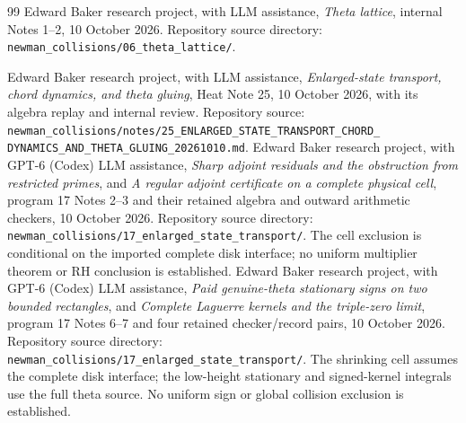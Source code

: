 \documentclass[11pt]{article}
\theoremstyle{definition}
\theoremstyle{remark}
\begin{document}
\begin{thebibliography}{99}
Edward Baker research project, with LLM assistance,
\emph{Theta lattice}, internal Notes 1--2, 10 October 2026.
Repository source directory:
\texttt{newman\_collisions/06\_theta\_lattice/}.

Edward Baker research project, with LLM assistance,
\emph{Enlarged-state transport, chord dynamics, and theta gluing},
Heat Note 25, 10 October 2026, with its algebra replay and internal review.
Repository source:
\texttt{newman\_collisions/notes/25\_ENLARGED\_STATE\_TRANSPORT\_CHORD\_}
\texttt{DYNAMICS\_AND\_THETA\_GLUING\_20261010.md}.
Edward Baker research project, with GPT-6 (Codex) LLM assistance,
\emph{Sharp adjoint residuals and the obstruction from restricted primes},
and \emph{A regular adjoint certificate on a complete physical cell},
program 17 Notes 2--3 and their retained algebra and outward arithmetic
checkers, 10 October 2026. Repository source directory:
\texttt{newman\_collisions/17\_enlarged\_state\_transport/}.
The cell exclusion is conditional on the imported complete disk interface;
no uniform multiplier theorem or RH conclusion is established.
Edward Baker research project, with GPT-6 (Codex) LLM assistance,
\emph{Paid genuine-theta stationary signs on two bounded rectangles},
and \emph{Complete Laguerre kernels and the triple-zero limit},
program 17 Notes 6--7 and four retained checker/record pairs,
10 October 2026. Repository source directory:
\texttt{newman\_collisions/17\_enlarged\_state\_transport/}.
The shrinking cell assumes the complete disk interface; the low-height
stationary and signed-kernel integrals use the full theta source.
No uniform sign or global collision exclusion is established.
\end{thebibliography}
\end{document}
